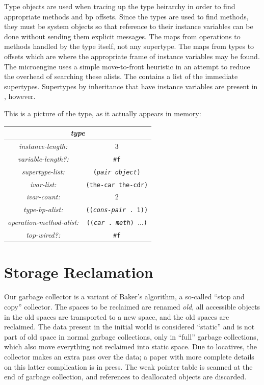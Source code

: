 Type objects are used when tracing up the type heirarchy in order to
find appropriate methods and bp offsets.  Since the types are used to
find methods, they must be system objects so that reference to their
instance variables can be done without sending them explicit messages.
The  maps from operations to methods
handled by the type itself, not any supertype.  The 
maps from types to offsets which are where the appropriate frame of
instance variables may be found.  The microengine uses a simple
move-to-front heuristic in an attempt to reduce the overhead of
searching these alists.  The  contains a list of
the immediate supertypes.  Supertypes by inheritance that have
instance variables are present in , however.

This is a picture of the  type, as it actually appears
in memory:

\begin{center}
\begin{tabular}{|c|c|} \hline
 \multicolumn{2}{|c|}{\emph{type}} \\\hline
 \emph{instance-length:} & 3 \\\hline
 \emph{variable-length?:} & \texttt{\#f} \\\hline
 \emph{supertype-list:} & \texttt{(\emph{pair} \emph{object})}\\\hline
 \emph{ivar-list:} & \texttt{(the-car the-cdr)} \\\hline
 \emph{ivar-count:} & 2 \\\hline
 \emph{type-bp-alist:} & \texttt{((\emph{cons-pair} . 1))} \\\hline
 \emph{operation-method-alist:} & \texttt{((\emph{car} . \emph{meth}) $\ldots$)}\\\hline
 \emph{top-wired?:} & \texttt{\#f} \\\hline
\end{tabular}
\end{center}

\section{Storage Reclamation}

Our garbage collector \citep{PEARLMUTTER99} is a variant of Baker's
algorithm, a so-called ``stop and copy'' collector.  The spaces to be
reclaimed are renamed \emph{old}, all accessible objects in the old
spaces are transported to a new space, and the old spaces are
reclaimed.  The data present in the initial world is considered
``static'' and is not part of old space in normal garbage collections,
only in ``full'' garbage collections, which also move everything not
reclaimed into static space.  Due to locatives, the collector makes an
extra pass over the data; a paper with more complete details on this
latter complication is in press.  The weak pointer table is scanned at
the end of garbage collection, and references to deallocated objects
are discarded.

